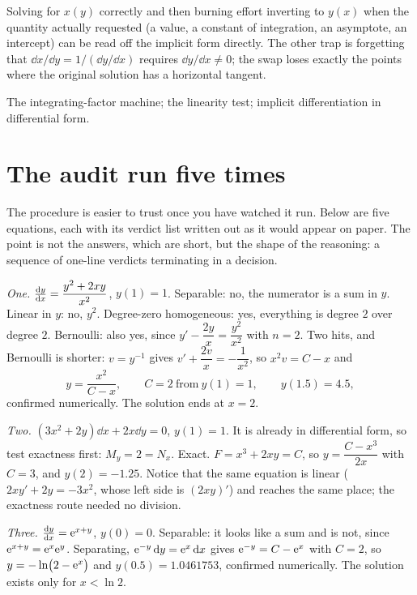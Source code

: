 \begin{trap}
Solving for $x(y)$ correctly and then burning effort inverting to $y(x)$ when the quantity actually requested (a value, a constant of integration, an asymptote, an intercept) can be read off the implicit form directly. The other trap is forgetting that $\dd x/\dd y=1/(\dd y/\dd x)$ requires $\dd y/\dd x\neq0$; the swap loses exactly the points where the original solution has a horizontal tangent.
\end{trap}

\begin{seealsob}The integrating-factor machine; the linearity test; implicit differentiation in differential form.\end{seealsob}

\section{The audit run five times}

The procedure is easier to trust once you have watched it run. Below are five equations, each with its verdict list written out as it would appear on paper. The point is not the answers, which are short, but the shape of the reasoning: a sequence of one-line verdicts terminating in a decision.

\emph{One.} $\frac{\mathrm{d}y}{\mathrm{d}x}=\dfrac{y^{2}+2xy}{x^{2}}$, $y(1)=1$. Separable: no, the numerator is a sum in $y$. Linear in $y$: no, $y^{2}$. Degree-zero homogeneous: yes, everything is degree $2$ over degree $2$. Bernoulli: also yes, since $y'-\dfrac{2y}{x}=\dfrac{y^{2}}{x^{2}}$ with $n=2$. Two hits, and Bernoulli is shorter: $v=y^{-1}$ gives $v'+\dfrac{2v}{x}=-\dfrac{1}{x^{2}}$, so $x^{2}v=C-x$ and
\[y=\frac{x^{2}}{C-x},\qquad C=2\ \text{from}\ y(1)=1,\qquad y(1.5)=4.5,\]
confirmed numerically. The solution ends at $x=2$.

\emph{Two.} $(3x^{2}+2y)\dd x+2x\dd y=0$, $y(1)=1$. It is already in differential form, so test exactness first: $M_y=2=N_x$. Exact. $F=x^{3}+2xy=C$, so $y=\dfrac{C-x^{3}}{2x}$ with $C=3$, and $y(2)=-1.25$. Notice that the same equation is linear ($2xy'+2y=-3x^{2}$, whose left side is $(2xy)'$) and reaches the same place; the exactness route needed no division.

\emph{Three.} $\frac{\mathrm{d}y}{\mathrm{d}x}=\mathrm{e}^{x+y}$, $y(0)=0$. Separable: it looks like a sum and is not, since $\mathrm{e}^{x+y}=\mathrm{e}^{x}\mathrm{e}^{y}$. Separating, $\mathrm{e}^{-y}\,\mathrm{d} y=\mathrm{e}^{x}\,\mathrm{d} x$ gives $\mathrm{e}^{-y}=C-\mathrm{e}^{x}$ with $C=2$, so $y=-\ln\bigl(2-\mathrm{e}^{x}\bigr)$ and $y(0.5)=1.0461753$, confirmed numerically. The solution exists only for $x<\ln2$.


